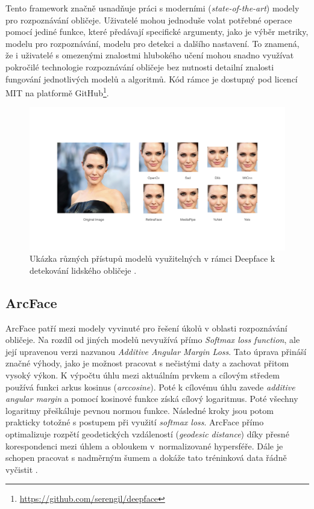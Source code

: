 Tento framework značně usnadňuje práci s moderními (\textit{state-of-the-art}) modely pro rozpoznávání obličeje. Uživatelé mohou jednoduše volat potřebné operace pomocí jediné funkce, které předávají specifické argumenty, jako je výběr metriky, modelu pro rozpoznávání, modelu pro detekci a dalšího nastavení. To znamená, že i uživatelé s omezenými znalostmi hlubokého učení mohou snadno využívat pokročilé technologie rozpoznávání obličeje bez nutnosti detailní znalosti fungování jednotlivých modelů a algoritmů. Kód rámce je dostupný pod licencí MIT na platformě GitHub\footnote{\url{https://github.com/serengil/deepface}}.

\begin{figure}[hbt]
	\centering
	\includegraphics[width=1\textwidth]{obrazky-figures/deepface_face_detection.jpeg}
	\caption{Ukázka různých přístupů modelů využitelných v rámci Deepface k detekování lidského obličeje \cite{serengil2020lightface}.}
        \label{fig:deepface-face-detection}
\end{figure}

\subsection*{ArcFace}

ArcFace patří mezi modely vyvinuté pro řešení úkolů v oblasti rozpoznávání obličeje. Na rozdíl od jiných modelů nevyužívá přímo \textit{Softmax loss function}, ale její upravenou verzi nazvanou \textit{Additive Angular Margin Loss}. Tato úprava přináší značné výhody, jako je možnost pracovat s nečistými daty a zachovat přitom vysoký výkon. K výpočtu úhlu mezi aktuálním prvkem a cílovým středem používá funkci arkus kosinus (\textit{arccosine}). Poté k cílovému úhlu zavede \textit{additive angular margin} a pomocí kosinové funkce získá cílový logaritmus. Poté všechny logaritmy přeškáluje pevnou normou funkce. Následné kroky jsou potom prakticky totožné s postupem při využití \textit{softmax loss}. ArcFace přímo optimalizuje rozpětí geodetických vzdáleností (\textit{geodesic distance}) díky přesné korespondenci mezi úhlem a obloukem v~normalizované hypersféře. Dále je schopen pracovat s nadměrným šumem a dokáže tato tréninková data řádně vyčistit \cite{Deng_2022}.


